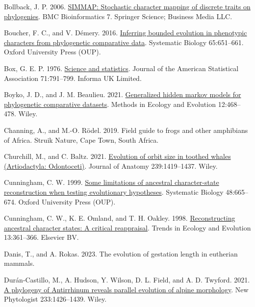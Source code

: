 \documentclass{article}
\newlength{\cslhangindent}
\newenvironment{CSLReferences}[2] %
 {\begin{list}{}{%
  \setlength{\itemindent}{0pt}
  \setlength{\leftmargin}{0pt}
  \setlength{\parsep}{0pt}
  \ifodd #1
   \setlength{\leftmargin}{\cslhangindent}
   \setlength{\itemindent}{-1\cslhangindent}
  \fi
  \setlength{\itemsep}{#2\baselineskip}}}
 {\end{list}}
\begin{document}
\begin{CSLReferences}{1}{0}
Bollback, J. P. 2006. \href{https://doi.org/10.1186/1471-2105-7-88}{{SIMMAP}: Stochastic character mapping of discrete traits on phylogenies}. BMC Bioinformatics 7. Springer Science; Business Media LLC.

Boucher, F. C., and V. Démery. 2016. \href{https://doi.org/10.1093/sysbio/syw015}{Inferring bounded evolution in phenotypic characters from phylogenetic comparative data}. Systematic Biology 65:651--661. Oxford University Press (OUP).

Box, G. E. P. 1976. \href{https://doi.org/10.1080/01621459.1976.10480949}{Science and statistics}. Journal of the American Statistical Association 71:791--799. Informa UK Limited.

Boyko, J. D., and J. M. Beaulieu. 2021. \href{https://doi.org/10.1111/2041-210x.13534}{Generalized hidden markov models for phylogenetic comparative datasets}. Methods in Ecology and Evolution 12:468--478. Wiley.

Channing, A., and M.-O. Rödel. 2019. Field guide to frogs and other amphibians of {A}frica. Struik Nature, Cape Town, South Africa.

Churchill, M., and C. Baltz. 2021. \href{https://doi.org/10.1111/joa.13522}{Evolution of orbit size in toothed whales ({A}rtiodactyla: {O}dontoceti)}. Journal of Anatomy 239:1419--1437. Wiley.

Cunningham, C. W. 1999. \href{https://doi.org/10.1080/106351599260238}{Some limitations of ancestral character-state reconstruction when testing evolutionary hypotheses}. Systematic Biology 48:665--674. Oxford University Press (OUP).

Cunningham, C. W., K. E. Omland, and T. H. Oakley. 1998. \href{https://doi.org/10.1016/s0169-5347(98)01382-2}{Reconstructing ancestral character states: A critical reappraisal}. Trends in Ecology and Evolution 13:361--366. Elsevier BV.

Danis, T., and A. Rokas. 2023. The evolution of gestation length in eutherian mammals.

Durán‐Castillo, M., A. Hudson, Y. Wilson, D. L. Field, and A. D. Twyford. 2021. \href{https://doi.org/10.1111/nph.17581}{A phylogeny of {A}ntirrhinum reveals parallel evolution of alpine morphology}. New Phytologist 233:1426--1439. Wiley.


\end{CSLReferences}
\end{document}
